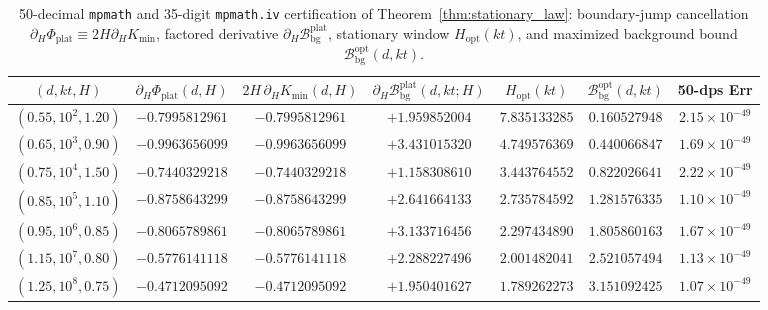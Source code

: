 \documentclass[11pt,reqno]{amsart}
\theoremstyle{definition}
\theoremstyle{remark}
\numberwithin{equation}{section}
\begin{document}
\begin{table}[t]
\centering
\caption{50-decimal \texttt{mpmath} and 35-digit \texttt{mpmath.iv} certification of Theorem~\ref{thm:stationary_law}: boundary-jump cancellation $\partial_H\Phi_{\mathrm{plat}} \equiv 2H\partial_H K_{\min}$, factored derivative $\partial_H \mathcal{B}_{\mathrm{bg}}^{\mathrm{plat}}$, stationary window $H_{\mathrm{opt}}(kt)$, and maximized background bound $\mathcal{B}_{\mathrm{bg}}^{\mathrm{opt}}(d,kt)$.}\label{tab:stationary_cert}
\footnotesize
\setlength{\tabcolsep}{3.4pt}
\begin{tabular}{@{}ccccccc@{}}
\toprule
$(d, kt, H)$ & $\partial_H\Phi_{\mathrm{plat}}(d,H)$ & $2H\,\partial_H K_{\min}(d,H)$ & $\partial_H\mathcal{B}_{\mathrm{bg}}^{\mathrm{plat}}(d,kt;H)$ & $H_{\mathrm{opt}}(kt)$ & $\mathcal{B}_{\mathrm{bg}}^{\mathrm{opt}}(d,kt)$ & 50-dps Err \\
\midrule
$(0.55, 10^2, 1.20)$ & $-0.7995812961$ & $-0.7995812961$ & $+1.959852004$ & $7.835133285$ & $0.160527948$ & $2.15 \times 10^{-49}$ \\
$(0.65, 10^3, 0.90)$ & $-0.9963656099$ & $-0.9963656099$ & $+3.431015320$ & $4.749576369$ & $0.440066847$ & $1.69 \times 10^{-49}$ \\
$(0.75, 10^4, 1.50)$ & $-0.7440329218$ & $-0.7440329218$ & $+1.158308610$ & $3.443764552$ & $0.822026641$ & $2.22 \times 10^{-49}$ \\
$(0.85, 10^5, 1.10)$ & $-0.8758643299$ & $-0.8758643299$ & $+2.641664133$ & $2.735784592$ & $1.281576335$ & $1.10 \times 10^{-49}$ \\
$(0.95, 10^6, 0.85)$ & $-0.8065789861$ & $-0.8065789861$ & $+3.133716456$ & $2.297434890$ & $1.805860163$ & $1.67 \times 10^{-49}$ \\
$(1.15, 10^7, 0.80)$ & $-0.5776141118$ & $-0.5776141118$ & $+2.288227496$ & $2.001482041$ & $2.521057494$ & $1.13 \times 10^{-49}$ \\
$(1.25, 10^8, 0.75)$ & $-0.4712095092$ & $-0.4712095092$ & $+1.950401627$ & $1.789262273$ & $3.151092425$ & $1.07 \times 10^{-49}$ \\
\bottomrule
\end{tabular}
\end{table}
\end{document}
